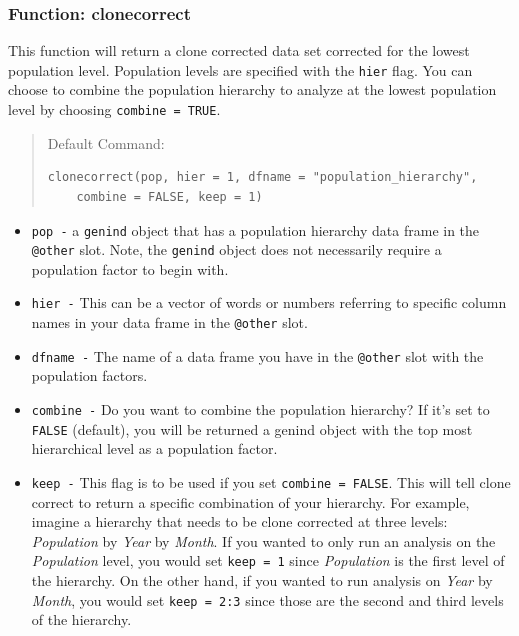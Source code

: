 \documentclass[letterpaper]{article}\usepackage[]{graphicx}\usepackage[]{color}
\makeatletter
\newenvironment{kframe}{%
 \def\at@end@of@kframe{}%
 \ifinner\ifhmode%
  \def\at@end@of@kframe{\end{minipage}}%
  \begin{minipage}{\columnwidth}%
 \fi\fi%
 \def\FrameCommand##1{\hskip\@totalleftmargin \hskip-\fboxsep
 \colorbox{shadecolor}{##1}\hskip-\fboxsep
     \hskip-\linewidth \hskip-\@totalleftmargin \hskip\columnwidth}%
 \MakeFramed {\advance\hsize-\width
   \@totalleftmargin\z@ \linewidth\hsize
   \@setminipage}}%
 {\par\unskip\endMakeFramed%
 \at@end@of@kframe}
\newenvironment{knitrout}{}{} %
\newcommand{\tab}{\hspace*{1em}}
\makeatother
\begin{document}
\subsubsection{Function: clonecorrect}\label{data.manip:cc:clonecorrect}

\tab\tab This function will return a clone corrected data set corrected for the lowest population level. Population levels are specified with the \texttt{hier} flag. You can choose to combine the population hierarchy to analyze at the lowest population level by choosing \texttt{combine = TRUE}.
\begin{quote}
Default Command:
\begin{knitrout}
\color{fgcolor}\begin{kframe}
\begin{verbatim}
clonecorrect(pop, hier = 1, dfname = "population_hierarchy", 
    combine = FALSE, keep = 1)
\end{verbatim}
\end{kframe}
\end{knitrout}

\end{quote}
\begin{itemize}
  \item \texttt{pop -} a \texttt{genind} object that has a population hierarchy data frame in the \texttt{@other} slot. Note, the \texttt{genind} object does not necessarily require a population factor to begin with. 
  \item \texttt{hier -} This can be a vector of words or numbers referring to specific column names in your data frame in the \texttt{@other} slot.
  \item \texttt{dfname -} The name of a data frame you have in the \texttt{@other} slot with the population factors.
  \item \texttt{combine -} Do you want to combine the population hierarchy? If it's set to \texttt{FALSE} (default), you will be returned a genind object with the top most hierarchical level as a population factor. 
  \item \texttt{keep -} This flag is to be used if you set \texttt{combine = FALSE}. This will tell clone correct to return a specific combination of your hierarchy. For example, imagine a hierarchy that needs to be clone corrected at three levels: \textit{Population} by \textit{Year} by \textit{Month}. If you wanted to only run an analysis on the \textit{Population} level, you would set \texttt{keep = 1} since \textit{Population} is the first level of the hierarchy. On the other hand, if you wanted to run analysis on \textit{Year} by \textit{Month}, you would set \texttt{keep = 2:3} since those are the second and third levels of the hierarchy. 
\end{itemize}
\end{document}
